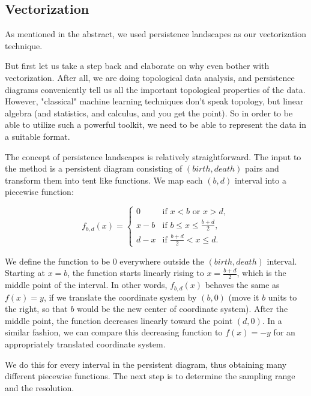 \documentclass{article}
\begin{document}
\subsection{Vectorization}

As mentioned in the abstract, we used persistence landscapes \cite{bubenik2015statistical} as our vectorization technique.

But first let us take a step back and elaborate on why even bother with vectorization. After all, we are doing topological data analysis, and persistence diagrams conveniently tell us all the important topological properties of the data. However, "classical" machine learning techniques don't speak topology, but linear algebra (and statistics, and calculus, and you get the point). So in order to be able to utilize such a powerful toolkit, we need to be able to represent the data in a suitable format.

The concept of persistence landscapes is relatively straightforward. The input to the method is a persistent diagram consisting of $(birth, death)$ pairs and transform them into tent like functions. We map each $(b, d)$ interval into a piecewise function:

\begin{equation*}
    f_{b,d}(x) =
    \begin{cases} 
        0 & \text{if } x < b \text{ or } x > d, \\
        x - b & \text{if } b \leq x \leq \frac{b + d}{2}, \\
        d - x & \text{if } \frac{b + d}{2} < x \leq d.
    \end{cases}
\end{equation*}

We define the function to be $0$ everywhere outside the $(birth, death)$ interval. Starting at $x=b$, the function starts linearly rising to $x=\frac{b+d}{2}$, which is the middle point of the interval. In other words, $f_{b,d}(x)$ behaves the same as $f(x)=y$, if we translate the coordinate system by $(b,0)$ (move it $b$ units to the right, so that $b$ would be the new center of coordinate system). After the middle point, the function decreases linearly toward the point $(d,0)$. In a similar fashion, we can compare this decreasing function to $f(x)=-y$ for an appropriately translated coordinate system.

We do this for every interval in the persistent diagram, thus obtaining many different piecewise functions. The next step is to determine the sampling range and the resolution.
\end{document}
